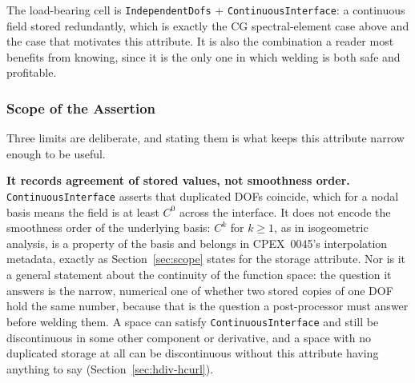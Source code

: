 \documentclass[11pt,letterpaper]{article}
\begin{document}


The load-bearing cell is \texttt{IndependentDofs} + \texttt{ContinuousInterface}: a
continuous field stored redundantly, which is exactly the CG
spectral-element case above and the case that motivates this attribute.
It is also the combination a reader most benefits from knowing, since it
is the only one in which welding is both safe and profitable.

\subsubsection{Scope of the Assertion}
\label{sec:continuity-scope}

Three limits are deliberate, and stating them is what keeps this
attribute narrow enough to be useful.

\textbf{It records agreement of stored values, not smoothness order.}
\texttt{ContinuousInterface} asserts that duplicated DOFs coincide,
which for a nodal basis means the field is at least $C^0$ across the
interface.  It does not encode the smoothness order of the underlying
basis: $C^k$ for $k \geq 1$, as in isogeometric analysis, is a property
of the basis and belongs in CPEX~0045's interpolation metadata, exactly
as Section~\ref{sec:scope} states for the storage attribute.  Nor is it
a general statement about the continuity of the function space: the
question it answers is the narrow, numerical one of whether two stored
copies of one DOF hold the same number, because that is the question a
post-processor must answer before welding them.  A space can satisfy
\texttt{ContinuousInterface} and still be discontinuous in some other
component or derivative, and a space with no duplicated storage at all
can be discontinuous without this attribute having anything to say
(Section~\ref{sec:hdiv-hcurl}).
\end{document}
